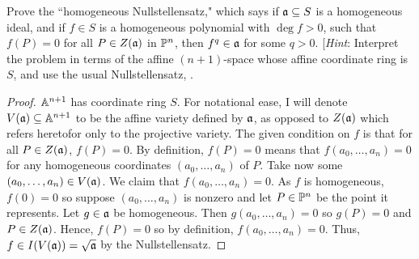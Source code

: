 \label{1.2.1}

Prove the ``homogeneous Nullstellensatz," which says if $\a \subseteq S$ is a homogeneous ideal, and if $f \in S$ is a homogeneous polynomial with $\deg f > 0$, such that $f(P) = 0$ for all $P \in Z(\a)$ in $\P^n$, then $f^q \in \a$ for some $q > 0$. [\textit{Hint}: Interpret the problem in terms of the affine $(n + 1)$-space whose affine coordinate ring is $S$, and use the
usual Nullstellensatz, \cite[1.3A]{hartshorne}.

\begin{proof}
	$\A^{n + 1}$ has coordinate ring $S$. For notational ease, I will denote $V(\a) \subseteq \A^{n + 1}$ to be the affine variety defined by $\a$, as opposed to $Z(\a)$ which refers heretofor only to the projective variety. The given condition on $f$ is that for all $P \in Z(\a)$, $f(P) = 0$. By definition, $f(P) = 0$ means that $f(a_0, \dots, a_n) = 0$ for any homogeneous coordinates $(a_0, \dots, a_n)$ of $P$. Take now some $(a_0, \dots, a_n) \in V(\a)$. We claim that $f(a_0, \dots, a_n) = 0$. As $f$ is homogeneous, $f(0) = 0$ so suppose $(a_0, \dots, a_n)$ is nonzero and let $P \in \P^n$ be the point it represents. Let $g \in \a$ be homogeneous. Then $g(a_0, \dots, a_n) = 0$ so $g(P) =  0$ and $P \in Z(\a)$. Hence, $f(P) = 0$ so by definition, $f(a_0, \dots, a_n) = 0$. Thus, $f \in I(V(\a)) = \sqrt{\a}$ by the Nullstellensatz.
\end{proof}
